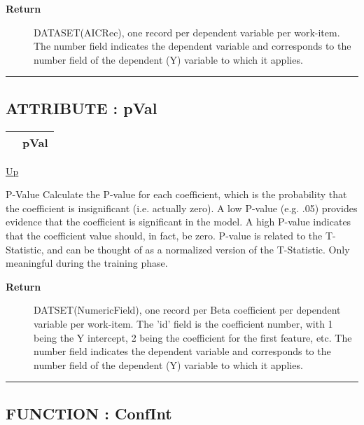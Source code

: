 \par
\begin{description}
\item [\textbf{Return}] DATASET(AICRec), one record per dependent variable per work-item. The number field indicates the dependent variable and corresponds to the number field of the dependent (Y) variable to which it applies.
\end{description}

\rule{\textwidth}{0.4pt}
\subsection*{ATTRIBUTE : pVal}
\hypertarget{ecldoc:linearregression.ols.pval}{}

{\renewcommand{\arraystretch}{1.5}
\begin{tabularx}{\textwidth}{|>{\raggedright\arraybackslash}l|X|}
\hline
\hspace{0pt} & pVal \\
\hline
\end{tabularx}
}

\hyperlink{ecldoc:linearregression.ols}{Up}

\par
P-Value Calculate the P-value for each coefficient, which is the probability that the coefficient is insignificant (i.e. actually zero). A low P-value (e.g. .05) provides evidence that the coefficient is significant in the model. A high P-value indicates that the coefficient value should, in fact, be zero. P-value is related to the T-Statistic, and can be thought of as a normalized version of the T-Statistic. Only meaningful during the training phase.

\par
\begin{description}
\item [\textbf{Return}] DATSET(NumericField), one record per Beta coefficient per dependent variable per work-item. The 'id' field is the coefficient number, with 1 being the Y intercept, 2 being the coefficient for the first feature, etc. The number field indicates the dependent variable and corresponds to the number field of the dependent (Y) variable to which it applies.
\end{description}

\rule{\textwidth}{0.4pt}
\subsection*{FUNCTION : ConfInt}
\hypertarget{ecldoc:linearregression.ols.confint}{}

